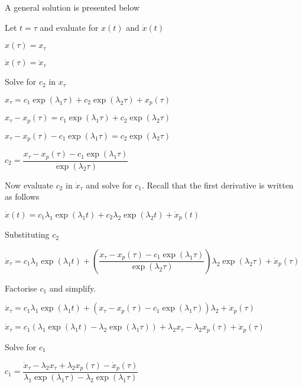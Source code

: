 A general solution is presented below

Let $t=\tau$ and evaluate for $x(t)$ and $\dot{x}(t)$

$x(\tau) = x_\tau$

$\dot{x}(\tau) = \dot{x}_\tau$

Solve for $c_2$ in $x_\tau$

$x_{\tau} = c_1 \exp{(\lambda_1 \tau)} + c_2 \exp{(\lambda_2 \tau)} + x_p (\tau)$

$x_{\tau} - x_p (\tau) = c_1 \exp{(\lambda_1 \tau)} + c_2 \exp{(\lambda_2 \tau)} $

$x_{\tau} - x_p (\tau) - c_1 \exp{(\lambda_1 \tau)} = c_2 \exp{(\lambda_2 \tau)} $

$c_2   = \dfrac{x_{\tau} - x_p (\tau) - c_1 \exp{(\lambda_1 \tau)}}{\exp{(\lambda_2 \tau)}} $

Now evaluate $c_2$ in $\dot{x}_\tau$ and solve for $c_1$. Recall that the first derivative is written as follows

$\dot{x}(t) = c_1 \lambda_1 \exp{(\lambda_1 t)} + c_2 \lambda_2 \exp{(\lambda_2 t)} +  \dot{x}_p (t) $

Substituting $c_2$

$\dot{x}_{\tau} = c_1 \lambda_1 \exp{(\lambda_1 t)} + (\dfrac{x_{\tau} - x_p (\tau) - c_1 \exp{(\lambda_1 \tau)}}{\exp{(\lambda_2 \tau)}}) \lambda_2 \exp{(\lambda_2 \tau)} +  \dot{x}_p (\tau) $

Factorise $c_1$ and simplify.

$\dot{x}_{\tau} = c_1 \lambda_1 \exp{(\lambda_1 t)} + (x_{\tau} - x_p (\tau) - c_1 \exp{(\lambda_1 \tau)}) \lambda_2  +  \dot{x}_p (\tau) $

$\dot{x}_{\tau} = c_1 (\lambda_1 \exp{(\lambda_1 t)} - \lambda_2 \exp{(\lambda_1 \tau)} )  + \lambda_2 x_{\tau} - \lambda_2 x_p (\tau)  +  \dot{x}_p (\tau) $

Solve for $c_1$

$c_1 = \dfrac{\dot{x}_{\tau} - \lambda_2 x_{\tau} + \lambda_2 x_p (\tau)  -  \dot{x}_p (\tau)}{ \lambda_1 \exp{(\lambda_1 \tau)} - \lambda_2 \exp{(\lambda_1 \tau)}  }  $

